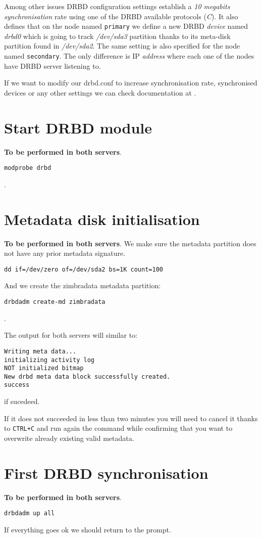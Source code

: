 Among other issues DRBD configuration settings establish a \textit{10 megabits synchronisation} rate using one of the DRBD available protocols (\textit{C}). It also defines that on the node named {\tt primary} we define a new DRBD \textit{device} named \textit{drbd0} which is going to track \textit{/dev/sda3} partition thanks to its meta-disk partition found in \textit{/dev/sda2}. The same setting is also specified for the node named {\tt secondary}. The only difference is IP \textit{address} where each one of the nodes have DRBD server listening to.

If we want to modify our drbd.conf to increase synchronisation rate, synchronised devices or any other settings we can check documentation at \cite{LinbitDRBDdrbdconf}.

\section {Start DRBD module}
\textbf{To be performed in both servers}.
\begin{verbatim}
modprobe drbd
\end{verbatim}
.
\section {Metadata disk initialisation}
\textbf{To be performed in both servers}.
We make sure the metadata partition does not have any prior metadata signature.
\begin{verbatim}
dd if=/dev/zero of=/dev/sda2 bs=1K count=100
\end{verbatim}
And we create the zimbradata metadata partition:
\begin{verbatim}
drbdadm create-md zimbradata
\end{verbatim}
.

The output for both servers will similar to:
\begin{verbatim}
Writing meta data...
initializing activity log
NOT initialized bitmap
New drbd meta data block successfully created.
success
\end{verbatim}
if sucedeed.

If it does not succeeded in less than two minutes you will need to cancel it thanks to {\tt CTRL+C} and run again the command while confirming that you want to overwrite already existing valid metadata.

\section {First DRBD synchronisation}
\textbf{To be performed in both servers}.
\begin{verbatim}
drbdadm up all
\end{verbatim}
If everything goes ok we should return to the prompt.

